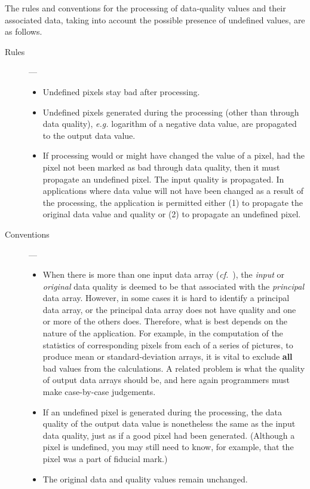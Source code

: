 The rules and conventions for the processing of data-quality
values and their associated data, taking into account the possible
presence of undefined values, are as follows.
\begin{description}
\item [Rules] ---
\begin{itemize}
\item Undefined pixels stay bad after processing.
\item Undefined pixels generated during the processing (other than
through data quality), {\it e.g.} logarithm of a negative data value,
are propagated to the output data value.
\item If processing would or might have changed the value
of a pixel, had the pixel
not been marked as bad through data quality, then it must propagate
an undefined pixel.  The input quality is propagated. In applications
where data value will not have been changed as a result of the
processing, the application is permitted either
(1) to propagate the original data
value and quality or (2) to propagate an undefined pixel. 
\end{itemize}
\item [Conventions] ---
\begin{itemize}
\item When there is more than one
input data array ({\it cf.}\ 
),
the {\it input} or {\it original} data quality is deemed to be that
associated with the {\it principal} data array.
However,
in some cases it is hard to identify a
principal data array, or the principal data array does not have
quality and one or more of the others does.
Therefore, what is best depends on the
nature of the application.
For example, in the computation
of the statistics of corresponding
pixels from each of a series of pictures, to produce mean or
standard-deviation arrays, it is vital to exclude {\bf all}
bad values from the
calculations.  A related problem is
what the quality of output data arrays should be, and
here again programmers must make case-by-case judgements.
\item If an undefined pixel is generated during the processing, the data
quality of the output data value is nonetheless
the same as the input data quality, just as
if a good pixel had been generated.  (Although a
pixel is undefined, you may still need to know, for example, that the
pixel was a part of fiducial mark.)
\item The original data and quality values remain unchanged.
\end{itemize}


\end{description}
